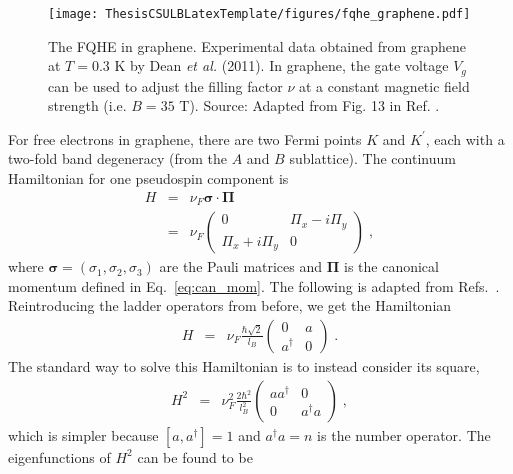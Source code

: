     \begin{figure}[H]
    \begin{center}
    \texttt{[image: ThesisCSULBLatexTemplate/figures/fqhe\_graphene.pdf]}
    \caption[The FQHE in graphene.\vspace{-12pt}]{The FQHE in graphene. Experimental data obtained from graphene at $T=0.3$ K by Dean \textit{et al.} (2011). In graphene, the gate voltage $V_g$ can be used to adjust the filling factor $\nu$ at a constant magnetic field strength (i.e. $B=35$ T). Source: Adapted from Fig. 13 in Ref. \cite{lin}.}
    \label{fqheGraph} 
    \end{center}
    \end{figure}
    
    For free electrons in graphene, there are two Fermi points $K$ and $K^\prime$, each with a two-fold band degeneracy (from the $A$ and $B$ sublattice). The continuum Hamiltonian for one pseudospin component is 
    \begin{eqnarray}
    H &=& \nu_F \mathbf{\sigma}\cdot \mathbf{\Pi}\\
    &=& \nu_F \begin{pmatrix}
    0 & \Pi_x - i \Pi_y\\
    \Pi_x + i\Pi_y & 0
    \end{pmatrix}\;,
    \end{eqnarray}
    where $\mathbf{\sigma} = (\sigma_1, \sigma_2, \sigma_3)$ are the Pauli matrices and $\mathbf{\Pi}$ is the canonical momentum defined in Eq.~\ref{eq:can_mom}. The following is adapted from Refs.~\cite{arciniaga, apalkov, goerbig, toke, nomura, Toke2007}. Reintroducing the ladder operators from before, we get the Hamiltonian
    \begin{eqnarray}
    H&=& \nu_F\frac{\hbar\sqrt{2}}{l_B} \begin{pmatrix}
    0 & a \\
    a^\dagger & 0
    \end{pmatrix}\;.
    \end{eqnarray}
    The standard way to solve this Hamiltonian is to instead consider its square, 
    \begin{eqnarray}
    H^2 &=& \nu_F^2\frac{2\hbar^2}{l_B^2} \begin{pmatrix}
    aa^\dagger & 0 \\
    0 & a^\dagger a
    \end{pmatrix}\;,
    \end{eqnarray}    
    which is simpler because $[a,a^\dagger]=1$ and $a^\dagger a=n$ is the number operator. The eigenfunctions of $H^2$ can be found to be 

